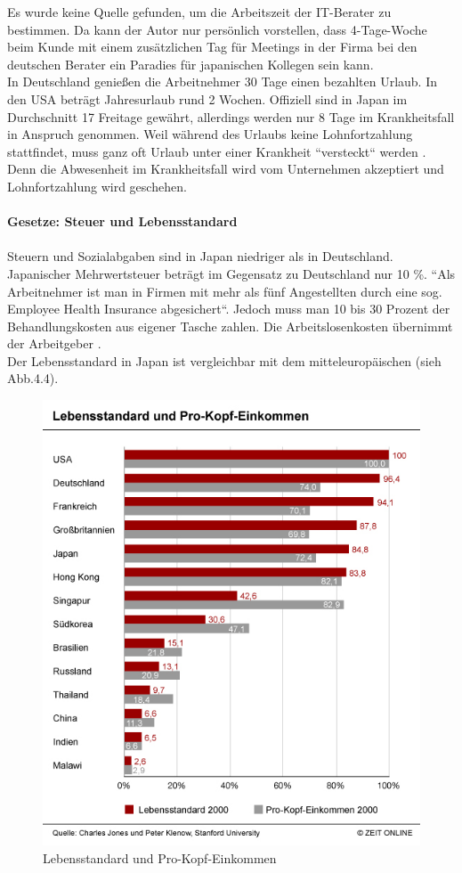 	Es wurde keine Quelle gefunden, um die Arbeitszeit der IT-Berater zu bestimmen. Da kann der Autor nur persönlich vorstellen, dass 4-Tage-Woche beim Kunde mit einem zusätzlichen Tag für Meetings in der Firma bei den deutschen Berater ein Paradies für japanischen Kollegen sein kann. \\
	In Deutschland genießen die Arbeitnehmer 30 Tage einen bezahlten Urlaub. In den USA beträgt Jahresurlaub rund 2 Wochen. Offiziell sind in Japan im Durchschnitt 17 Freitage gewährt, allerdings werden nur 8 Tage im Krankheitsfall in Anspruch genommen. Weil während des Urlaubs keine Lohnfortzahlung stattfindet, muss ganz oft Urlaub unter einer Krankheit ``versteckt`` werden \cite{JPArbeitSozKultur}. Denn die Abwesenheit im Krankheitsfall wird vom Unternehmen akzeptiert und Lohnfortzahlung wird geschehen.\\
	\\
		\textbf{Gesetze: Steuer und Lebensstandard}\\
		\\
		Steuern und Sozialabgaben sind in Japan niedriger als in Deutschland. Japanischer Mehrwertsteuer beträgt im Gegensatz zu Deutschland nur 10 \%.
		``Als Arbeitnehmer ist man in Firmen mit mehr als fünf Angestellten durch eine sog. Employee Health Insurance abgesichert``. Jedoch muss man 10 bis 30 Prozent der Behandlungskosten aus eigener Tasche zahlen. Die Arbeitslosenkosten übernimmt der Arbeitgeber \cite{ArbZeitJP}.
		\\Der Lebensstandard in Japan ist vergleichbar mit dem mitteleuropäischen (sieh Abb.4.4).
		\begin{figure}[ht]
		\centering
		\includegraphics[width=0.7\linewidth]{./images/Lebensstandard-Pro-Kopf-Einkommen}
		\caption{Lebensstandard und Pro-Kopf-Einkommen \cite{LebensStd}}
		\label{fig:LebStdProKEink}
		\end{figure}\\

